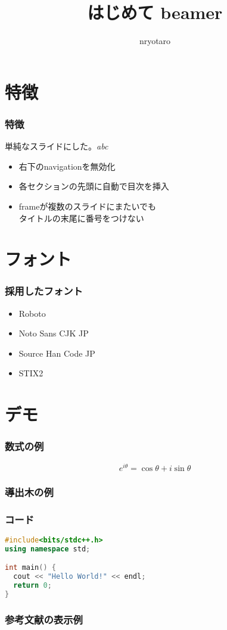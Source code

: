 \documentclass[unicode, 14pt]{beamer}
\title{はじめて beamer}
\author{nryotaro}
\begin{document}
\begin{frame}
\titlepage
\end{frame}
\section{特徴}
\begin{frame}[t]
  \frametitle{特徴}
    単純なスライドにした。\textit{abc}
  \vspace{0.2\paperheight}
  \begin{itemize}
    \item 右下のnavigationを無効化
    \item 各セクションの先頭に自動で目次を挿入
    \item frameが複数のスライドにまたいでも\\タイトルの末尾に番号をつけない
  \end{itemize}
\end{frame}

\section{フォント}

\begin{frame}
\frametitle{採用したフォント}
\begin{itemize}
  \item Roboto
  \item Noto Sans CJK JP
  \item Source Han Code JP
  \item STIX2
\end{itemize}
\end{frame}

\section{デモ}

\begin{frame}
  \frametitle{数式の例}
  \begin{equation}
    e^{i\theta} = \cos\theta + i\sin \theta
  \end{equation}
\end{frame}

\begin{frame}
  \frametitle{導出木の例}
  \begin{prooftree}
  \end{prooftree}
\end{frame}

\begin{frame}[fragile]
\frametitle{コード}
  {\small 
    \begin{lstlisting}[language=C++]
#include<bits/stdc++.h>
using namespace std;

int main() {
  cout << "Hello World!" << endl;
  return 0;
}
    \end{lstlisting}
}
\end{frame}

\begin{frame}[allowframebreaks]
  \frametitle{参考文献の表示例}
  \printbibliography
  \nocite{*} 
\end{frame}
\end{document}
